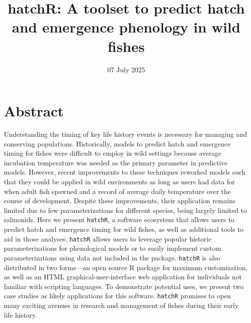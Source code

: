 \documentclass[12pt,halfline,a4paper,]{ouparticle}
\begin{document}
\title{hatchR: A toolset to predict hatch and emergence phenology in
wild fishes}

\author{%
%
\and
{}
\and
{}
%
%
%
%
}

\abstract{}

\date{07 July 2025}

\keywords{}

\maketitle



\section{Abstract}\label{abstract}

Understanding the timing of key life history events is necessary for
managing and conserving populations. Historically, models to predict
hatch and emergence timing for fishes were difficult to employ in wild
settings because average incubation temperature was needed as the
primary parameter in predictive models. However, recent improvements to
these techniques reworked models such that they could be applied in wild
environments as long as users had data for when adult fish spawned and a
record of average daily temperature over the course of development.
Despite these improvements, their application remains limited due to few
parameterizations for different species, being largely limited to
salmonids. Here we present \texttt{hatchR}, a software ecosystem that
allows users to predict hatch and emergence timing for wild fishes, as
well as additional tools to aid in those analyses. \texttt{hatchR}
allows users to leverage popular historic parameterizations for
phenological models or to easily implement custom parameterizations
using data not included in the package. \texttt{hatchR} is also
distributed in two forms---an open source R package for maximum
customization, as well as an HTML graphical-user-interface web
application for individuals not familiar with scripting languages. To
demonstrate potential uses, we present two case studies as likely
applications for this software. \texttt{hatchR} promises to open many
exciting avenues in research and management of fishes during their early
life history.
\end{document}
